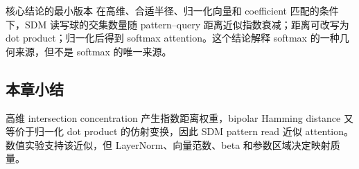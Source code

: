 
\begin{importantbox}{核心结论的最小版本}
在高维、合适半径、归一化向量和 coefficient 匹配的条件下，SDM 读写球的交集数量随 pattern--query 距离近似指数衰减；距离可改写为 dot product；归一化后得到 softmax attention。这个结论解释 softmax 的一种几何来源，但不是 softmax 的唯一来源。
\end{importantbox}

\subsection{本章小结}

高维 intersection concentration 产生指数距离权重，bipolar Hamming distance 又等价于归一化 dot product 的仿射变换，因此 SDM pattern read 近似 attention。数值实验支持该近似，但 LayerNorm、向量范数、beta 和参数区域决定映射质量。

